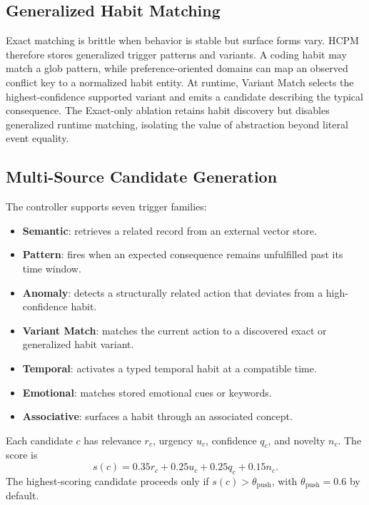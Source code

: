 \documentclass[sigconf,anonymous,review]{acmart}
\newcommand{\system}{HCPM}
\begin{document}
\subsection{Generalized Habit Matching}

Exact matching is brittle when behavior is stable but surface forms vary.
\system{} therefore stores generalized trigger patterns and variants.
A coding habit may match a glob pattern, while preference-oriented domains can map an observed conflict key to a normalized habit entity.
At runtime, Variant Match selects the highest-confidence supported variant and emits a candidate describing the typical consequence.
The Exact-only ablation retains habit discovery but disables generalized runtime matching, isolating the value of abstraction beyond literal event equality.

\subsection{Multi-Source Candidate Generation}

The controller supports seven trigger families:
\begin{itemize}
    \item \textbf{Semantic}: retrieves a related record from an external vector store.
    \item \textbf{Pattern}: fires when an expected consequence remains unfulfilled past its time window.
    \item \textbf{Anomaly}: detects a structurally related action that deviates from a high-confidence habit.
    \item \textbf{Variant Match}: matches the current action to a discovered exact or generalized habit variant.
    \item \textbf{Temporal}: activates a typed temporal habit at a compatible time.
    \item \textbf{Emotional}: matches stored emotional cues or keywords.
    \item \textbf{Associative}: surfaces a habit through an associated concept.
\end{itemize}

Each candidate $c$ has relevance $r_c$, urgency $u_c$, confidence $q_c$, and novelty $n_c$.
The score is
\begin{equation}
s(c)=0.35r_c+0.25u_c+0.25q_c+0.15n_c.
\end{equation}
The highest-scoring candidate proceeds only if $s(c)>\theta_{\mathrm{push}}$, with $\theta_{\mathrm{push}}=0.6$ by default.
\end{document}
